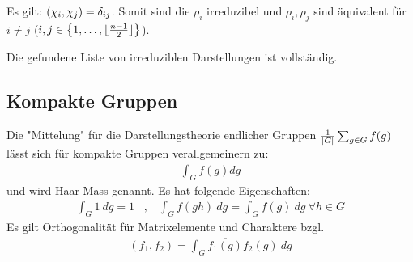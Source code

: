 Es gilt: $\left( \chi_i , \chi_j \right) = \delta_{ij}$. Somit sind die
$\rho_i$ irreduzibel und $\rho_i , \rho_j$ sind äquivalent für $i \neq j$
($i,j \in \left\{ 1,\dots,\lfloor \frac{n-1}{2} \rfloor \right\}$).

Die gefundene Liste von irreduziblen Darstellungen ist vollständig.

\subsection{Kompakte Gruppen}
Die "Mittelung" für die Darstellungstheorie endlicher Gruppen
$\frac{1}{\left\vert G \right\vert} \sum_{g \in G} f(g)$ lässt sich für kompakte Gruppen
verallgemeinern zu:
\begin{align*}
    \int_G f(g) dg
\end{align*}
und wird Haar Mass genannt. Es hat folgende Eigenschaften:
\begin{align*}
    \int_G 1 \ dg = 1
    \hspace{10pt} , \hspace{10pt}
    \int_G f(g h) \ dg = \int_G f(g) \ dg \ \forall h \in G
\end{align*}
Es gilt Orthogonalität für Matrixelemente und Charaktere bzgl.
\begin{align*}
    (f_1,f_2) = \int_G \overline{f_1(g)} f_2(g) \ dg
\end{align*}
